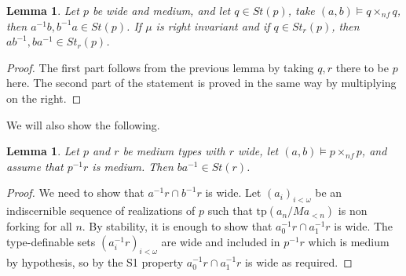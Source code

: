 \documentclass[12pt]{article}
\newtheorem{lemme}[thm]{Lemma}
\theoremstyle{definition}
\theoremstyle{mystyle}
\theoremstyle{remark}
\newcommand{\tp}{\mathrm{tp}}
\newcommand{\nf}{\times_{nf}}
\begin{document}
\begin{lemme}\label{lem1}
Let $p$ be wide and medium, and let $q\in St(p)$, take $(a,b)\models q\nf q$, then $a^{-1}b, b^{-1}a \in St(p)$. If $\mu$ is right invariant and if $q\in St_r(p)$, then $ab^{-1}, ba^{-1}\in St_r(p)$.
\end{lemme}
\begin{proof}
The first part follows from the previous lemma by taking $q,r$ there to be $p$ here. The second part of the statement is proved in the same way by multiplying on the right.
\end{proof}


We will also show the following.

\begin{lemme}\label{repeatedClaim}
Let $p$ and $r$ be medium types with $r$ wide, let
$(a,b)\models p \times_{nf} p$, and assume that $p^{-1}r$ is
medium. Then $ba^{-1}\in St(r)$.
\end{lemme}

\begin{proof}
We need to show that $a^{-1} r \cap b^{-1} r$ is wide. Let
$(a_i)_{i<\omega}$ be an indiscernible sequence of realizations of
$p$ such that $\tp(a_n/Ma_{<n})$ is non forking for all $n$. By
stability, it is enough to show that $a_0^{-1} r \cap a_1^{-1} r$
is wide. The type-definable sets $(a_i^{-1} r)_{i<\omega}$ are
wide and included in $p^{-1}r$ which is medium by hypothesis, so
by the S1 property $a_0^{-1} r\cap a_1^{-1} r$ is wide as
required.
\end{proof}
\end{document}
